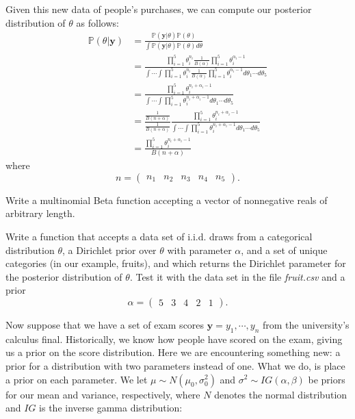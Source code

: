 Given this new data of people's purchases, we can compute our posterior distribution of $\theta$ as follows:
\begin{align*}
\mathbb{P}(\theta | \mathbf{y}) & = \frac{\mathbb{P}(\mathbf{y} | \theta) \mathbb{P}(\theta)}{\int \mathbb{P}(\mathbf{y} | \theta) \mathbb{P}(\theta) d\theta} \\
& = \frac{\prod_{i=1}^{5} \theta_{i}^{n_{i}} \frac{1}{B(\alpha)} \prod_{i=1}^{5} \theta_{i}^{\alpha_{i}-1}}{\int \cdots \int \prod_{i=1}^{5} \theta_{i}^{n_{i}} \frac{1}{B(\alpha)} \prod_{i=1}^{5} \theta_{i}^{\alpha_{i}-1} d\theta_{1}\cdots d\theta_{5}} \\
& = \frac{\prod_{i=1}^{5} \theta_{i}^{n_{i} + \alpha_{i} - 1}}{\int \cdots \int \prod_{i=1}^{5} \theta_{i}^{n_{i} + \alpha_{i} - 1} d\theta_{1} \cdots d\theta_{5}} \\
& = \frac{\frac{1}{B(n + \alpha)}}{\frac{1}{B(n+\alpha)}} \frac{\prod_{i=1}^{5} \theta_{i}^{n_{i} + \alpha_{i} - 1}}{\int \cdots \int \prod_{i=1}^{5} \theta_{i}^{n_{i} + \alpha_{i} - 1} d\theta_{1} \cdots d\theta_{5}} \\
& = \frac{\prod_{i=1}^{5} \theta_{i}^{n_{i} + \alpha_{i} - 1}}{B(n + \alpha)}
\end{align*}
where $$n = \left( \begin{array}{ccccc} n_{1} & n_{2} & n_{3} & n_{4} & n_{5} \end{array} \right).$$

\begin{problem}
Write a multinomial Beta function accepting a vector of nonnegative reals of arbitrary length.
\end{problem}

\begin{problem}
Write a function that accepts a data set of i.i.d. draws from a categorical distribution $\theta$, a Dirichlet prior over $\theta$ with parameter $\alpha$, and a set of unique categories (in our example, fruits), and which returns the Dirichlet parameter for the posterior distribution of $\theta$. Test it with the data set in the file \emph{fruit.csv} and a prior $$\alpha = \left( \begin{array}{ccccc} 5 & 3 & 4 & 2 & 1 \end{array} \right).$$
\end{problem}

Now suppose that we have a set of exam scores $\mathbf{y} = y_{1}, \cdots, y_{n}$ from the university's calculus final. Historically, we know how people have scored on the exam, giving us a prior on the score distribution. Here we are encountering something new: a prior for a distribution with two parameters instead of one. What we do, is place a prior on each parameter. We let $\mu \sim N(\mu_{0}, \sigma_{0}^{2})$ and $\sigma^{2} \sim IG(\alpha, \beta)$ be priors for our mean and variance, respectively, where $N$ denotes the normal distribution and $IG$ is the inverse gamma distribution:

